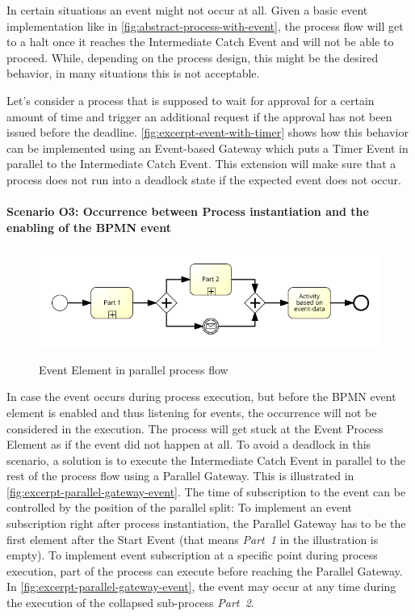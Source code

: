 In certain situations an event might not occur at all. Given a basic event implementation like in \autoref{fig:abstract-process-with-event}, the process flow will get to a halt once it reaches the Intermediate Catch Event and will not be able to proceed. While, depending on the process design, this might be the desired behavior, in many situations this is not acceptable.

Let's consider a process that is supposed to wait for approval for a certain amount of time and trigger an additional request if the approval has not been issued before the deadline. \autoref{fig:excerpt-event-with-timer} shows how this behavior can be implemented using an Event-based Gateway which puts a Timer Event in parallel to the Intermediate Catch Event. This extension will make sure that a process does not run into a deadlock state if the expected event does not occur.



\paragraph{Scenario O3: Occurrence between Process instantiation and the enabling of the BPMN event}
\begin{figure}[]
	\myfloatalign
	{\includegraphics[width=1\linewidth]{chapters/assessment/parallel-gateway-early-subscription.png}}
	\caption{Event Element in parallel process flow}\label{fig:excerpt-parallel-gateway-event}
\end{figure}

In case the event occurs during process execution, but before the BPMN event element is enabled and thus listening for events, the occurrence will not be considered in the execution. The process will get stuck at the Event Process Element as if the event did not happen at all.
To avoid a deadlock in this scenario, a solution is to execute the Intermediate Catch Event in parallel to the rest of the process flow using a Parallel Gateway. This is illustrated in \autoref{fig:excerpt-parallel-gateway-event}. The time of subscription to the event can be controlled by the position of the parallel split: To implement an event subscription right after process instantiation, the Parallel Gateway has to be the first element after the Start Event (that means \textit{Part~1} in the illustration is empty). To implement event subscription at a specific point during process execution, part of the process can execute before reaching the Parallel Gateway. In \autoref{fig:excerpt-parallel-gateway-event}, the event may occur at any time during the execution of the collapsed sub-process \textit{Part~2}. 

